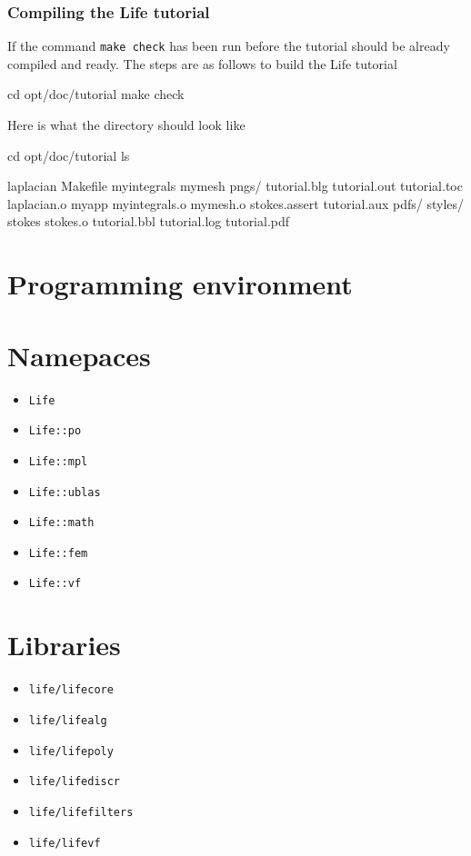 \documentclass[a4paper]{book}
\begin{document}
\subsubsection{Compiling the Life tutorial}
\label{sec:comp-life-tutor}
If the command \lstinline!make check! has been run before the tutorial
should be already compiled and ready. The steps are as follows  to build the Life tutorial
\begin{unixcom}
  cd opt/doc/tutorial
  make check
\end{unixcom}
Here is what the directory should look like
\begin{unixcom}
  cd opt/doc/tutorial
  ls

  laplacian     Makefile      myintegrals   mymesh       pngs/
  tutorial.blg  tutorial.out  tutorial.toc  laplacian.o  myapp
  myintegrals.o mymesh.o      stokes.assert tutorial.aux pdfs/ styles/
  stokes        stokes.o      tutorial.bbl  tutorial.log tutorial.pdf
\end{unixcom}


\section{Programming environment}

\section{Namepaces}

\begin{itemize}
\item \lstinline!Life!
\item \lstinline!Life::po!
\item \lstinline!Life::mpl!
\item \lstinline!Life::ublas!
\item \lstinline!Life::math!
\item \lstinline!Life::fem!
\item \lstinline!Life::vf!

\end{itemize}

\section{Libraries}

\begin{itemize}
\item \lstinline!life/lifecore!
\item \lstinline!life/lifealg!
\item \lstinline!life/lifepoly!
\item \lstinline!life/lifediscr!
\item \lstinline!life/lifefilters!
\item \lstinline!life/lifevf!
\end{itemize}
\end{document}

